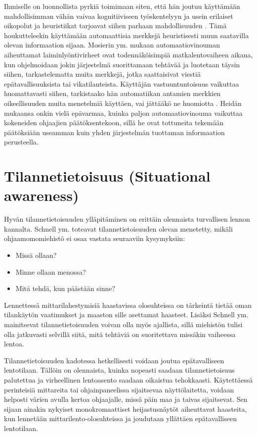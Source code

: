 \documentclass[utf8,bachelor,manualbib]{gradu3}
\begin{document}
Ihmiselle on luonnollista pyrkiä toimimaan siten, että hän joutuu käyttämään mahdollisimman vähän vaivaa kognitiiviseen työskentelyyn ja usein erilaiset oikopolut ja heuristiikat tarjoavat siihen parhaan mahdollisuuden \citep{fisketaylor1994}. Tämä houkutteleekin käyttämään automaattisia merkkejä heuristisesti muun saatavilla olevan informaation sijaan. Mosierin ym. \citeyearpar{mosierym1994} mukaan automaatiovinouman aiheuttamat laiminlyöntivirheet ovat todennäköisimpiä matkalentovaiheen aikana, kun ohjelmoidaan jokin järjestelmä suorittamaan tehtävää ja luotetaan täysin siihen, tarkastelematta muita merkkejä, jotka saattaisivat viestiä epätavallisuuksista tai vikatilanteista. Käyttäjän vastuuntuntoisuus vaikuttaa huomattavasti siihen, tarkistaako hän automatiikan antamien merkkien oikeellisuuden muita menetelmiä käyttäen, vai jättääkö ne huomiotta \citep{mosierym1998}. Heidän mukaansa onkin vielä epävarmaa, kuinka paljon automaatiovinouma vaikuttaa kokeneiden ohjaajien päätöksentekoon, sillä he ovat tottuneita tekemään päätöksiään useamman kuin yhden järjestelmän tuottaman informaation perusteella.

\section{Tilannetietoisuus (Situational awareness)}

Hyvän tilannetietoisuuden ylläpitäminen on erittäin olennaista turvallisen lennon kannalta. Schnell ym. \citeyearpar{schnellym2004} toteavat tilannetietoisuuden olevan menetetty, mikäli ohjaamomomiehistö ei osaa vastata seuraaviin kysymyksiin:

\begin{itemize}
\item Missä ollaan?
\item Minne ollaan menossa?
\item Mitä tehdä, kun päästään sinne?
\end{itemize}

Lennettessä mittarilahestymisiä haastavissa olosuhteissa on tärkeintä tietää oman tilankäytön vaatimukset ja maaston sille asettamat haasteet. Lisäksi Schnell ym. \citeyearpar{schnellym2004} mainitsevat tilannetietoisuuden voivan olla myös ajallista, sillä miehistön tulisi olla jatkuvasti selvillä siitä, mitä tehtäviä on suoritettava missäkin vaiheessa lentoa.

Tilannetietoisuuden kadotessa hetkellisesti voidaan joutua epätavalliseen lentotilaan. Tällöin on olennaista, kuinka nopeasti saadaan tilannetietoisuus palutettua ja virheellinen lentoasento saadaan oikaistua tehokkaasti. Käytettäessä perinteisiä mittareita tai ohjainpaneelissa sijaitsevaa näyttölaitetta, voidaan helposti värien avulla kertoa ohjaajalle, missä päin maa ja taivas sijaitsevat. Sen sijaan ainakin nykyiset monokromaattiset heijastusnäytöt aiheuttavat haasteita, kun lennetään mittarilento-olosuhteissa ja joudutaan yllättäen epätavalliseen lentotilaan.
\end{document}
